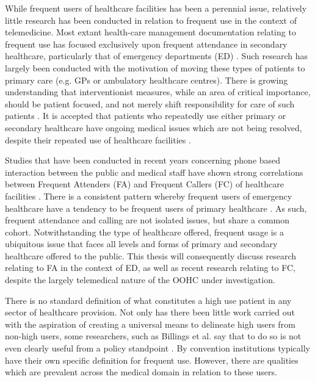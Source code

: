 While frequent users of healthcare facilities has been a perennial issue, relatively little research has been conducted in relation to frequent use in the context of telemedicine. Most extant health-care management documentation relating to frequent use has focused exclusively upon frequent attendance in secondary healthcare, particularly that of emergency departments (ED) \cite{jelinek2008frequent,hockey2014understanding,khatua2019tale}. Such research has largely been conducted with the motivation of moving these types of patients to primary care (e.g. GPs or ambulatory healthcare centres). There is growing understanding that interventionist measures, while an area of critical importance, should be patient focused, and not merely shift responsibility for care of such patients \cite{hockey2014understanding}. It is accepted that patients who repeatedly use either primary or secondary healthcare have ongoing medical issues which are not being resolved, despite their repeated use of healthcare facilities \cite{morriss2007cluster}. 

Studies that have been conducted in recent years concerning phone based interaction between the public and medical staff have shown strong correlations between Frequent Attenders (FA) and Frequent Callers (FC) of healthcare facilities \cite{krieg2016individual}. There is a consistent pattern whereby frequent users of emergency healthcare have a tendency to be frequent users of primary healthcare \cite{byrne2003frequent,krieg2016individual}. As such, frequent attendance and calling are not isolated issues, but share a common cohort. Notwithstanding the type of healthcare offered, frequent usage is a ubiquitous issue that faces all levels and forms of primary and secondary healthcare offered to the public. This thesis will consequently discuss research relating to  FA in the context of ED, as well as recent research relating to FC, despite the largely telemedical nature of the OOHC under investigation.  

There is no standard definition of what constitutes a high use patient in any sector of healthcare provision. Not only has there been little work carried out with the aspiration of creating a universal means to delineate high users from non-high users, some researchers, such as Billings et al. say that to do so is not even clearly useful from a policy standpoint \cite{billings2013dispelling}. By convention institutions typically have their own specific definition for frequent use. However, there are qualities which are prevalent across the medical domain in relation to these users.

